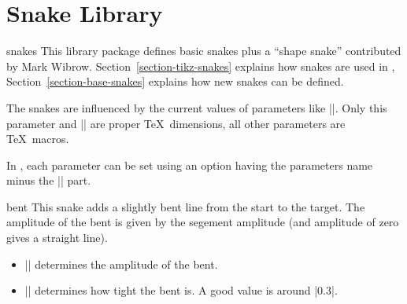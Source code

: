 %
%
%


\section{Snake Library}

\label{section-library-snakes}

\begin{pgflibrary}{snakes}
  This library package defines basic snakes plus a ``shape snake''
  contributed by Mark Wibrow.
  Section~\ref{section-tikz-snakes} explains how snakes are
  used in \tikzname, Section~\ref{section-base-snakes} explains how
  new snakes can be defined.

  The snakes are influenced by the current values of parameters like
  |\pgfsnakesegmentamplitude|. Only this parameter and
  |\pgfsnakesegmentlength| are proper \TeX\ dimensions, all other
  parameters are \TeX\ macros.

  In \tikzname, each parameter can be set using an option having the
  parameters name minus the |\pgfsnake| part.
\end{pgflibrary}


\begin{snake}{bent}
  This snake adds a slightly bent line from the start to the
  target. The amplitude of the bent is given by the segement amplitude
  (and amplitude of zero gives a straight line). 
  \begin{itemize}
  \item |\pgfsnakesegmentamplitude|
    determines the amplitude of the bent.
  \item |\pgfsnakesegmentaspect|
    determines how tight the bent is. A good value is around |0.3|. 
  \end{itemize}
\begin{codeexample}[]
\end{codeexample}
\end{snake}



